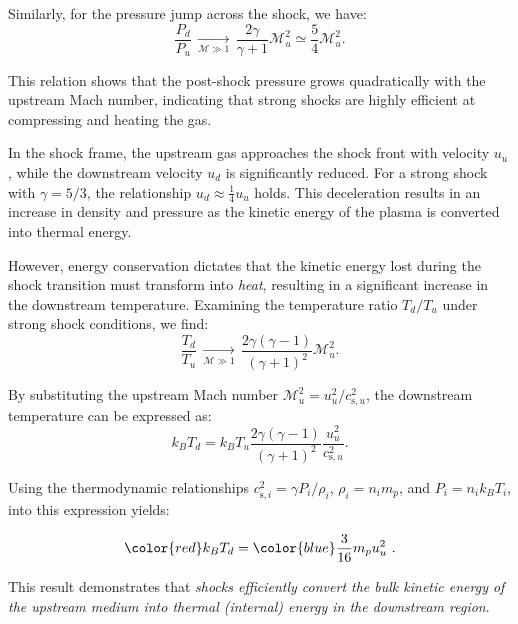 Similarly, for the pressure jump across the shock, we have:
%
\begin{equation}
\frac{P_d}{P_u} \, \underset{\mathcal{M} \gg 1}{\longrightarrow} \, \frac{2 \gamma}{\gamma + 1} \mathcal{M}_u^2 \simeq \frac{5}{4} \mathcal{M}_u^2.
\end{equation}

This relation shows that the post-shock pressure grows quadratically with the upstream Mach number, indicating that strong shocks are highly efficient at compressing and heating the gas.

In the shock frame, the upstream gas approaches the shock front with velocity \( u_u \), while the downstream velocity \( u_d \) is significantly reduced. For a strong shock with \( \gamma = 5/3 \), the relationship \( u_d \approx \frac{1}{4}u_u \) holds. This deceleration results in an increase in density and pressure as the kinetic energy of the plasma is converted into thermal energy.

However, energy conservation dictates that the kinetic energy lost during the shock transition must transform into \emph{heat}, resulting in a significant increase in the downstream temperature. Examining the temperature ratio \( T_d / T_u \) under strong shock conditions, we find:
%
\begin{equation}
\frac{T_d}{T_u}  \, \underset{\mathcal{M} \gg 1}{\longrightarrow} \, \frac{2 \gamma (\gamma - 1)}{(\gamma +1)^2} \mathcal{M}_u^2.
\end{equation}

By substituting the upstream Mach number \( \mathcal{M}_u^2 = u_u^2 / c_{\text{s},u}^2 \), the downstream temperature can be expressed as:
%
\begin{equation}
k_B T_d = k_B T_u \frac{2 \gamma (\gamma - 1)}{(\gamma + 1)^2} \frac{u_u^2}{c_{\text{s},u}^2}.
\end{equation}

Using the thermodynamic relationships \( c_{\text{s},i}^2 = \gamma P_i / \rho_i \), \( \rho_i = n_i m_p \), and \( P_i = n_i k_B T_i \), into this expression yields:
%
\begin{remark}
\begin{equation}
{\color{red}k_B T_d} = {\color{blue}\frac{3}{16} m_p u_u^2}~.
\end{equation}
\end{remark}

This result demonstrates that \emph{shocks efficiently convert the {\color{blue}bulk kinetic energy of the upstream medium} into {\color{red}thermal (internal) energy in the downstream region}}. 

